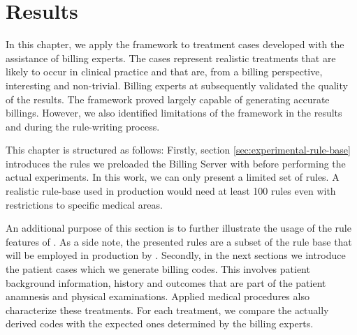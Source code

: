 \chapter{Results}\label{ch:results}
In this chapter, we apply the framework to treatment cases developed with the assistance of billing experts.
The cases represent realistic treatments that are likely to occur in clinical practice and that are, from a billing perspective, interesting and non-trivial.
Billing experts at \AV subsequently validated the quality of the results.
The framework proved largely capable of generating accurate billings.
However, we also identified limitations of the framework in the results and during the rule-writing process.

This chapter is structured as follows:
Firstly, section \ref{sec:experimental-rule-base} introduces the rules we preloaded the Billing Server with before performing the actual experiments.
In this work, we can only present a limited set of rules.
A realistic rule-base used in production would need at least 100 rules even with restrictions to specific medical areas.

An additional purpose of this section is to further illustrate the usage of the rule features of \RL.
As a side note, the presented rules are a subset of the rule base that will be employed in production by \AV.
Secondly, in the next sections we introduce the patient cases which we generate billing codes.
This involves patient background information, history and outcomes that are part of the patient anamnesis and physical examinations.
Applied medical procedures also characterize these treatments.
For each treatment, we compare the actually derived codes with the expected ones determined by the billing experts.



%
